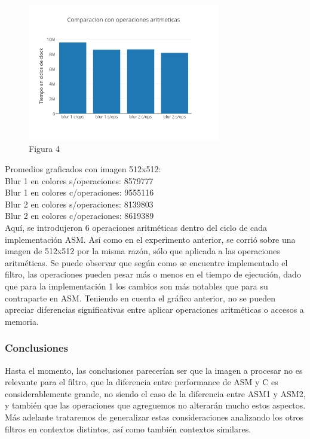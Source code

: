 \documentclass[a4paper]{article}
\begin{document}
\begin{figure}[h]
  \centering
    \includegraphics[width=0.75\textwidth]{imagenes/ComparacionConOperacionesAritmeticasBlurColores.png}
  \caption{Figura 4}
  \label{fig:graficoblur4}
\end{figure}
 \FloatBarrier

Promedios graficados con imagen 512x512:
\\

Blur 1 en colores s/operaciones: 8579777
\\

Blur 1 en colores c/operaciones: 9555116
\\

Blur 2 en colores s/operaciones: 8139803
\\

Blur 2 en colores c/operaciones: 8619389
\\

Aquí, se introdujeron 6 operaciones aritméticas dentro del ciclo de cada implementación ASM. Así como en el experimento anterior, se corrió sobre una imagen de 512x512 por la misma razón, sólo que aplicada a las operaciones aritméticas. Se puede observar que según como se encuentre implementado el filtro, las operaciones pueden pesar más o menos en el tiempo de ejecución, dado que para la implementación 1 los cambios son más notables que para su contraparte en ASM. Teniendo en cuenta el gráfico anterior, no se pueden apreciar diferencias significativas entre aplicar operaciones aritméticas o accesos a memoria.


\subsubsection{Conclusiones}

Hasta el momento, las conclusiones parecerían ser que la imagen a procesar no es relevante para el filtro, que la diferencia entre performance de ASM y C es considerablemente grande, no siendo el caso de la diferencia entre ASM1 y ASM2, y también que las operaciones que agreguemos no alterarán mucho estos aspectos. Más adelante trataremos de generalizar estas consideraciones analizando los otros filtros en contextos distintos, así como también contextos similares.
\end{document}

